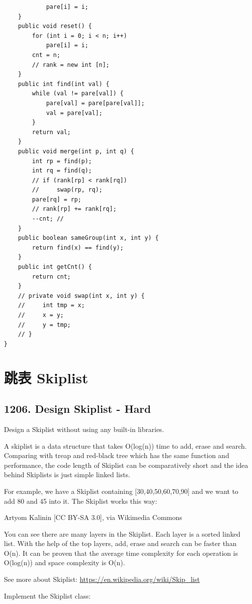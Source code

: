 \documentclass[9pt, b5paaper]{book}
\begin{document}
\begin{enumerate}
\begin{verbatim}
            pare[i] = i;
    }
    public void reset() {
        for (int i = 0; i < n; i++) 
            pare[i] = i;
        cnt = n;
        // rank = new int [n];
    }
    public int find(int val) {
        while (val != pare[val]) {
            pare[val] = pare[pare[val]];
            val = pare[val];
        }
        return val;
    }
    public void merge(int p, int q) {
        int rp = find(p);
        int rq = find(q);
        // if (rank[rp] < rank[rq]) 
        //     swap(rp, rq);
        pare[rq] = rp;
        // rank[rp] += rank[rq];
        --cnt; //
    }
    public boolean sameGroup(int x, int y) {
        return find(x) == find(y);
    }
    public int getCnt() {
        return cnt;
    }
    // private void swap(int x, int y) {
    //     int tmp = x;
    //     x = y;
    //     y = tmp;
    // }
}
\end{verbatim}
\end{enumerate}
\section{跳表 Skiplist}
\label{sec-1-10}
\subsection{1206. Design Skiplist - Hard}
\label{sec-1-10-1}
Design a Skiplist without using any built-in libraries.

A skiplist is a data structure that takes O(log(n)) time to add, erase and search. Comparing with treap and red-black tree which has the same function and performance, the code length of Skiplist can be comparatively short and the idea behind Skiplists is just simple linked lists.

For example, we have a Skiplist containing [30,40,50,60,70,90] and we want to add 80 and 45 into it. The Skiplist works this way:


Artyom Kalinin [CC BY-SA 3.0], via Wikimedia Commons

You can see there are many layers in the Skiplist. Each layer is a sorted linked list. With the help of the top layers, add, erase and search can be faster than O(n). It can be proven that the average time complexity for each operation is O(log(n)) and space complexity is O(n).

See more about Skiplist: \url{https://en.wikipedia.org/wiki/Skip_list}

Implement the Skiplist class:
\end{document}
